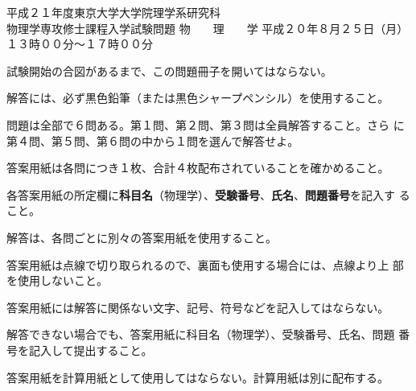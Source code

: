 \begin{inshicover}%
  {平成２１年度東京大学大学院理学系研究科\\物理学専攻修士課程入学試験問題}%
  {物　　理　　学}%
  {平成２０年８月２５日（月）　１３時００分〜１７時００分}
\item 試験開始の合図があるまで、この問題冊子を開いてはならない。
\item 解答には、必ず黒色鉛筆（または黒色シャープペンシル）を使用すること。
\item 問題は全部で６問ある。第１問、第２問、第３問は全員解答すること。さら
      に第４問、第５問、第６問の中から１問を選んで解答せよ。
\item 答案用紙は各問につき１枚、合計４枚配布されていることを確かめること。
\item 各答案用紙の所定欄に{\bf 科目名}（物理学）、{\bf 受験番号}、{\bf 氏名}、{\bf 問題番号}を記入す
      ること。
\item 解答は、各問ごとに別々の答案用紙を使用すること。
\item 答案用紙は点線で切り取られるので、裏面も使用する場合には、点線より上
      部を使用しないこと。
\item 答案用紙には解答に関係ない文字、記号、符号などを記入してはならない。
\item 解答できない場合でも、答案用紙に科目名（物理学）、受験番号、氏名、問題
      番号を記入して提出すること。
\item 答案用紙を計算用紙として使用してはならない。計算用紙は別に配布する。
\end{inshicover}
